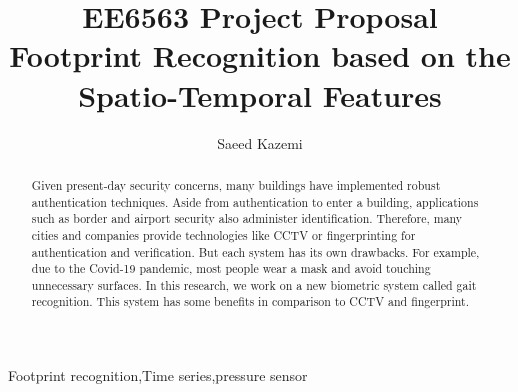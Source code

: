 \begin{frontmatter}

\title{\Huge EE6563 Project Proposal\\ Footprint Recognition based on the\\ Spatio-Temporal Features }


\author{Saeed Kazemi}
\address{University of New Brunswick}


\begin{abstract}
Given present-day security concerns, many buildings have implemented robust authentication techniques. Aside from authentication to enter a building, applications such as border and airport security also administer identification. Therefore, many cities and companies provide technologies like CCTV or fingerprinting for authentication and verification. But each system has its own drawbacks. For example, due to the Covid-19 pandemic, most people wear a mask and avoid touching unnecessary surfaces. In this research, we work on a new biometric system called gait recognition. This system has some benefits in comparison to CCTV and fingerprint. 
\end{abstract}

\begin{keyword}
Footprint recognition\sep Time series\sep pressure sensor
\end{keyword}

\end{frontmatter}
